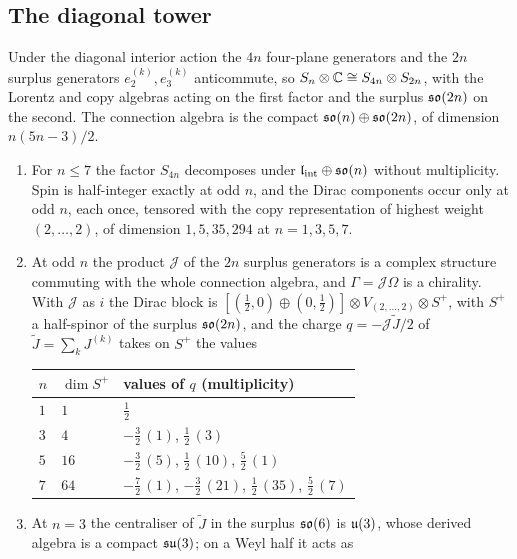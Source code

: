 \subsection{The diagonal tower}

Under the diagonal interior action the $4n$ four-plane generators and the $2n$ surplus generators $e^{(k)}_2,e^{(k)}_3$ anticommute, so
$S_n\otimes\mathbb{C}\cong S_{4n}\otimes S_{2n}$, with the Lorentz and copy algebras acting on the first factor and the surplus $\mathfrak{so}(2n)$ on the second. The
connection algebra is the compact $\mathfrak{so}(n)\oplus\mathfrak{so}(2n)$, of dimension $n(5n-3)/2$.

\begin{proposition}
\label{prop:diagtower}
\begin{enumerate}[label=(\roman*),leftmargin=2.2em]
\item For $n\le7$ the factor $S_{4n}$ decomposes under $\mathfrak l_{\rm int}\oplus\mathfrak{so}(n)$ without multiplicity. Spin is half-integer exactly at odd $n$, and the Dirac
components occur only at odd $n$, each once, tensored with the copy representation of highest weight $(2,\dots,2)$, of dimension $1,5,35,294$ at
$n=1,3,5,7$.
\item At odd $n$ the product $\mathcal J$ of the $2n$ surplus generators is a complex structure commuting with the whole connection algebra, and
$\Gamma=\mathcal J\Omega$ is a chirality. With $\mathcal J$ as $i$ the Dirac block is $[(\tfrac12,0)\oplus(0,\tfrac12)]\otimes V_{(2,\dots,2)}\otimes S^+$,
with $S^+$ a half-spinor of the surplus $\mathfrak{so}(2n)$, and the charge $q=-\mathcal J\tilde J/2$ of $\tilde J=\sum_kJ^{(k)}$ takes on $S^+$ the values
\begin{center}
\begin{tabular}{@{}lll@{}}
\toprule
$n$ & $\dim S^+$ & values of $q$ (multiplicity)\\
\midrule
$1$ & $1$ & $\tfrac12$\\
$3$ & $4$ & $-\tfrac32\,(1)$, $\tfrac12\,(3)$\\
$5$ & $16$ & $-\tfrac32\,(5)$, $\tfrac12\,(10)$, $\tfrac52\,(1)$\\
$7$ & $64$ & $-\tfrac72\,(1)$, $-\tfrac32\,(21)$, $\tfrac12\,(35)$, $\tfrac52\,(7)$\\
\bottomrule
\end{tabular}
\end{center}
\item At $n=3$ the centraliser of $\tilde J$ in the surplus $\mathfrak{so}(6)$ is $\mathfrak{u}(3)$, whose derived algebra is a compact $\mathfrak{su}(3)$; on a Weyl half it acts as

\end{enumerate}
\end{proposition}
